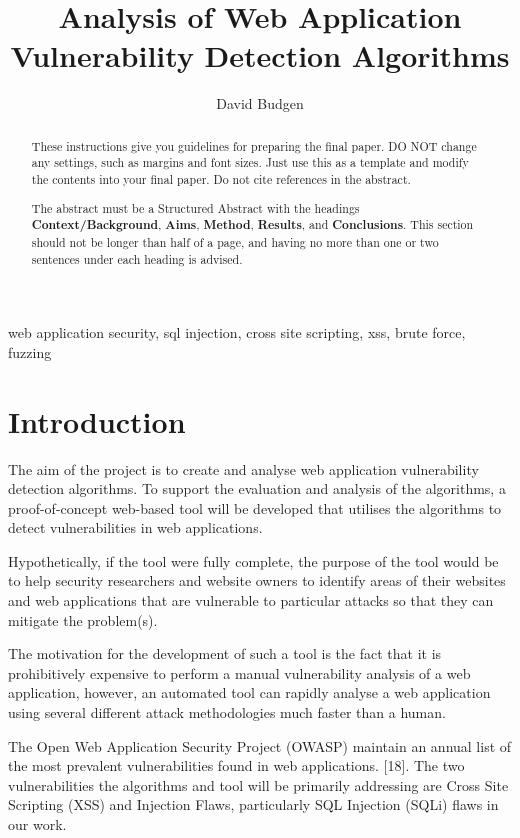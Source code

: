 \documentclass[12pt,a4paper]{article}
\title{Analysis of Web Application Vulnerability Detection Algorithms}
\author{David Budgen}
\date{}
\begin{document}
\maketitle

\begin{abstract}
    These instructions give you guidelines for preparing the final paper.  DO NOT change any settings, such as margins and font sizes.  Just use this as a template and modify the contents into your final paper.  Do not cite references in the abstract.

    The abstract must be a Structured Abstract with the headings {\bf Context/Background}, {\bf Aims}, {\bf Method}, {\bf Results}, and {\bf Conclusions}.  This section should not be longer than half of a page, and having no more than one or two sentences under each heading is advised.
\end{abstract}

\begin{keywords}
    web application security, sql injection, cross site scripting, xss, brute force, fuzzing
\end{keywords}

\section{Introduction}
The aim of the project is to create and analyse web application vulnerability detection algorithms.  To support the evaluation and analysis of the algorithms, a proof-of-concept web-based tool will be developed that utilises the algorithms to detect vulnerabilities in web applications.

Hypothetically, if the tool were fully complete, the purpose of the tool would be to help security researchers and website owners to identify areas of their websites and web applications that are vulnerable to particular attacks so that they can mitigate the problem(s).

The motivation for the development of such a tool is the fact that it is prohibitively expensive to perform a manual vulnerability analysis of a web application, however, an automated tool can rapidly analyse a web application using several different attack methodologies much faster than a human.

The Open Web Application Security Project (OWASP) maintain an annual list of the most prevalent vulnerabilities found in web applications. [18].  The two vulnerabilities the algorithms and tool will be primarily addressing are Cross Site Scripting (XSS) and Injection Flaws, particularly SQL Injection (SQLi) flaws in our work.
\end{document}
